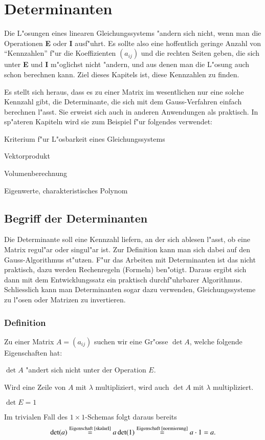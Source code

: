 \chapter{Determinanten\label{chapter-determinanten}}
Die L"osungen eines linearen Gleichungssystems "andern sich nicht,
wenn man die Operationen {\bf E} oder {\bf I} ausf"uhrt.
Es sollte
also eine hoffentlich geringe Anzahl von ``Kennzahlen'' f"ur die
Koeffizienten $(a_{ij})$
und die rechten Seiten geben, die sich unter {\bf E} und {\bf I}
m"oglichst nicht "andern, und aus denen man die L"osung auch
schon berechnen kann.
Ziel dieses Kapitels ist, diese Kennzahlen zu finden.

Es stellt sich heraus, dass es zu einer Matrix
im wesentlichen nur eine solche Kennzahl gibt, die Determinante,
die sich mit dem Gauss-Verfahren einfach berechnen l"asst.
Sie erweist sich auch in anderen Anwendungen als praktisch.
In sp"ateren Kapiteln
wird sie zum Beispiel f"ur folgendes verwendet:
\begin{compactitem}
\item Kriterium f"ur L"osbarkeit eines Gleichungssystems
\item Vektorprodukt
\item Volumenberechnung
\item Eigenwerte, charakteristisches Polynom
\end{compactitem}
\section{Begriff der Determinanten}
Die Determinante soll eine Kennzahl liefern, an der sich ablesen
l"asst, ob eine Matrix regul"ar oder singul"ar ist.
Zur Definition kann man sich dabei auf den Gauss-Algorithmus st"utzen.
F"ur das
Arbeiten mit Determinanten ist das nicht praktisch, dazu werden
Rechenregeln (Formeln) ben"otigt.
Daraus ergibt sich dann mit
dem Entwicklungssatz ein praktisch durchf"uhrbarer Algorithmus.
Schliesslich kann man Determinanten sogar dazu verwenden, Gleichungssysteme
zu l"osen oder Matrizen zu invertieren.
\subsection{Definition}
Zu einer Matrix $A=(a_{ij})$ suchen wir eine Gr"osse
$\det A$, welche folgende Eigenschaften hat:
\begin{compactenum}
\item $\det A$ "andert sich nicht unter der Operation $E$.\label{invarianzE}
\item Wird eine Zeile von $A$ mit $\lambda$ multipliziert,\label{skalarI}
wird auch $\det A$ mit $\lambda$ multipliziert.
\item $\det E=1$\label{normierung}
\end{compactenum}
Im trivialen Fall des $1\times1$-Schemas folgt daraus bereits
\[
\det(a)\overset{\text{Eigenschaft \ref{skalarI}}}=a\det(1)\overset{\text{Eigenschaft \ref{normierung}}}=a\cdot 1=a.
\]

